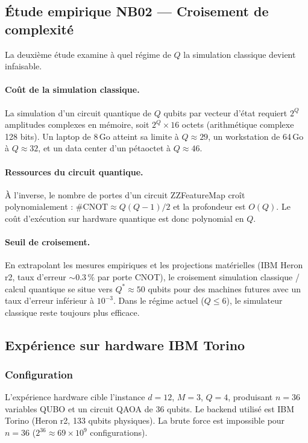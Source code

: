 \documentclass[12pt,a4paper]{article}
\begin{document}
\subsection{Étude empirique NB02 — Croisement de complexité}
\label{sec:nb02}

La deuxième étude examine à quel régime de $Q$ la simulation classique
devient infaisable.

\paragraph{Coût de la simulation classique.}
La simulation d'un circuit quantique de $Q$ qubits par vecteur d'état
requiert $2^Q$ amplitudes complexes en mémoire, soit $2^Q \times 16$
octets (arithmétique complexe 128 bits).
Un laptop de 8\,Go atteint sa limite à $Q \approx 29$,
un workstation de 64\,Go à $Q \approx 32$,
et un data center d'un pétaoctet à $Q \approx 46$.

\paragraph{Ressources du circuit quantique.}
À l'inverse, le nombre de portes d'un circuit ZZFeatureMap croît polynomialement :
$\#\mathrm{CNOT} \approx Q(Q-1)/2$ et la profondeur est $O(Q)$.
Le coût d'exécution sur hardware quantique est donc polynomial en $Q$.

\paragraph{Seuil de croisement.}
En extrapolant les mesures empiriques et les projections matérielles (IBM
Heron r2, taux d'erreur $\sim 0.3\,\%$ par porte CNOT), le croisement
simulation classique / calcul quantique se situe vers $Q^* \approx 50$
qubits pour des machines futures avec un taux d'erreur inférieur à
$10^{-3}$.
Dans le régime actuel ($Q \leq 6$), le simulateur classique reste toujours
plus efficace.

\subsection{Expérience sur hardware IBM Torino}
\label{sec:hardware}

\subsubsection{Configuration}

L'expérience hardware cible l'instance $d = 12$, $M = 3$, $Q = 4$, produisant
$n = 36$ variables QUBO et un circuit QAOA de 36 qubits.
Le backend utilisé est IBM Torino (Heron r2, 133 qubits physiques).
La brute force est impossible pour $n = 36$ ($2^{36} \approx 69 \times 10^9$
configurations).
\end{document}
